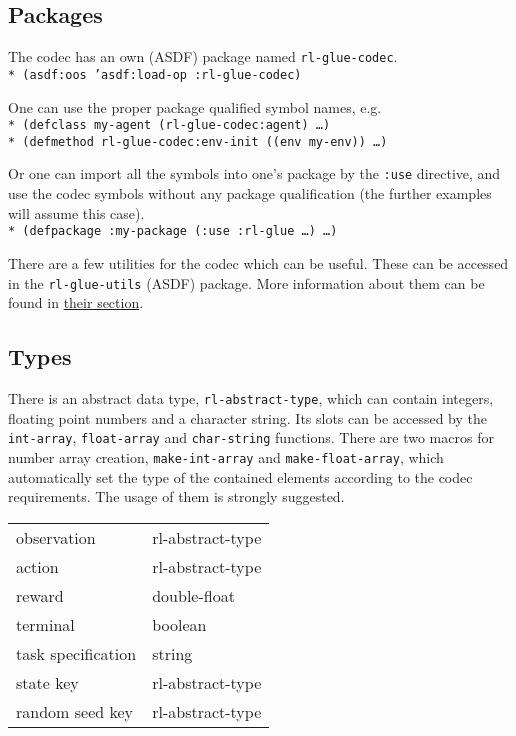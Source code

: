 \documentclass[11pt,a4paper,dvipdfm]{article}
\newcommand{\prompttext}[1]{\texttt{#1}}
\newcommand{\lispprompt}[1]{\prompttext{* #1}}
\begin{document}
\subsection{Packages}

The codec has an own (ASDF) package named \prompttext{rl-glue-codec}. \\
\lispprompt{(asdf:oos 'asdf:load-op :rl-glue-codec)}

One can use the proper package qualified symbol names, e.g. \\
\lispprompt{(defclass my-agent (rl-glue-codec:agent) \ldots)} \\
\lispprompt{(defmethod rl-glue-codec:env-init ((env my-env)) \ldots)}

Or one can import all the symbols into one's package by the \prompttext{:use}
directive, and use the codec symbols without any package qualification
(the further examples will assume this case). \\
\lispprompt{(defpackage :my-package (:use :rl-glue \ldots)~\ldots)}

There are a few utilities for the codec which can be useful. These can be
accessed in the \prompttext{rl-glue-utils} (ASDF) package. More information
about them can be found in \hyperlink{rlutils}{their section}.

\subsection{Types}

There is an abstract data type, \prompttext{rl-abstract-type}, which can
contain integers, floating point numbers and a character string. Its slots can
be accessed by the \prompttext{int-array}, \prompttext{float-array} and
\prompttext{char-string} functions. There are two macros for number array
creation, \prompttext{make-int-array} and \prompttext{make-float-array},
which automatically set the type of the contained elements according to the
codec requirements. The usage of them is strongly suggested.

\begin{center}
\begin{tabular}{ll}
    observation         & rl-abstract-type \\
    action              & rl-abstract-type \\
    reward              & double-float \\
    terminal            & boolean \\
    task specification  & string \\
    state key           & rl-abstract-type \\
    random seed key     & rl-abstract-type \\
\end{tabular}
\end{center}
\end{document}

